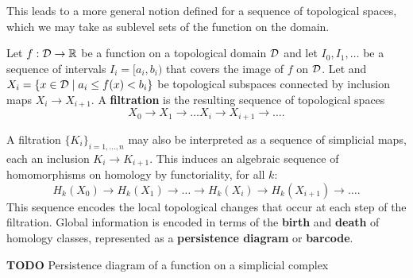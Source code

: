 This leads to a more general notion defined for a sequence of topological spaces, which we may take as sublevel sets of the function on the domain.
\begin{definition}
    Let $f:{\mathcal{D}}\to\mathbb{R}$ be a function on a topological domain ${\mathcal{D}}$ and let $I_0, I_1,\ldots$ be a sequence of intervals $I_i = [a_i, b_i)$ that covers the image of $f$ on ${\mathcal{D}}$.
    Let and $X_i = \{x\in{\mathcal{D}}\mid a_i\leq f(x) < b_i\}$ be topological subspaces connected by inclusion maps $X_i\to X_{i+1}$.
    A \textbf{filtration} is the resulting sequence of topological spaces
    \[X_0\to X_1\to\ldots X_i\to X_{i+1}\to\ldots .\]
\end{definition}
A filtration $\{K_i\}_{i=1,\ldots,n}$ may also be interpreted as a sequence of simplicial maps, each an inclusion $K_i\to K_{i+1}$.
This induces an algebraic sequence of homomorphisms on homology by functoriality, for all $k$:
\[ H_k(X_0)\to H_k(X_1)\to\ldots\to H_k(X_i)\to H_k(X_{i+1})\to\ldots . \]
This sequence encodes the local topological changes that occur at each step of the filtration.
Global information is encoded in terms of the \textbf{birth} and \textbf{death} of homology classes, represented as a \textbf{persistence diagram} or \textbf{barcode}.

\vspace{0.25in}
\textbf{TODO} Persistence diagram of a function on a simplicial complex
\vspace{0.25in}

